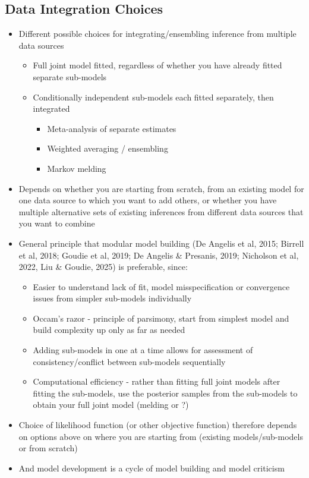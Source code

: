 \documentclass{article}
\begin{document}
\subsection{Data Integration Choices}

\begin{itemize}
    \item Different possible choices for integrating/ensembling inference from multiple data sources
    \begin{itemize}
        \item Full joint model fitted, regardless of whether you have already fitted separate sub-models
        \item Conditionally independent sub-models each fitted separately, then integrated
        \begin{itemize}
            \item Meta-analysis of separate estimates
            \item Weighted averaging / ensembling
            \item Markov melding
        \end{itemize}
    \end{itemize}
    \item Depends on whether you are starting from scratch, from an existing model for one data source to which you want to add others, or whether you have multiple alternative sets of existing inferences from different data sources that you want to combine
    \item General principle that modular model building (De Angelis et al, 2015; Birrell et al, 2018; Goudie et al, 2019; De Angelis \& Presanis, 2019; Nicholson et al, 2022, Liu \& Goudie, 2025) is preferable, since:
    \begin{itemize}
        \item Easier to understand lack of fit, model misspecification or convergence issues from simpler sub-models individually
        \item Occam's razor - principle of parsimony, start from simplest model and build complexity up only as far as needed
        \item Adding sub-models in one at a time allows for assessment of consistency/conflict between sub-models sequentially
        \item Computational efficiency - rather than fitting full joint models after fitting the sub-models, use the posterior samples from the sub-models to obtain your full joint model (melding or ?)
    \end{itemize}
    \item Choice of likelihood function (or other objective function) therefore depends on options above on where you are starting from (existing models/sub-models or from scratch)
    \item And model development is a cycle of model building and model criticism
\end{itemize}
\end{document}
